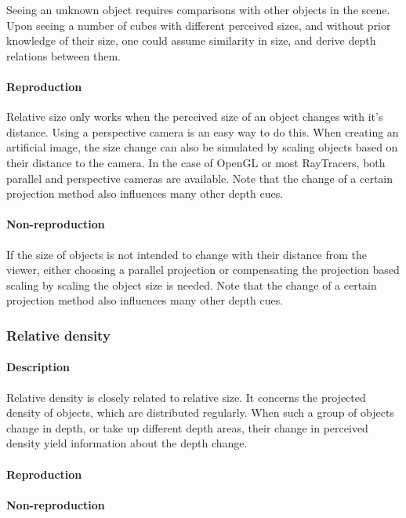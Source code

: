 Seeing an unknown object requires comparisons with other objects in the scene. Upon seeing a number of cubes with different perceived sizes, and without prior knowledge of their size, one could assume similarity in size, and derive depth relations between them.

\paragraph{Reproduction}
Relative size only works when the perceived size of an object changes with it's distance. Using a perspective camera is an easy way to do this. When creating an artificial image, the size change can also be simulated by scaling objects based on their distance to the camera. In the case of OpenGL or most RayTracers, both parallel and perspective cameras are available.
Note that the change of a certain projection method also influences many other depth cues.

\paragraph{Non-reproduction}
If the size of objects is not intended to change with their distance from the viewer, either choosing a parallel projection or compensating the projection based scaling by scaling the object size is needed.
Note that the change of a certain projection method also influences many other depth cues.


\subsubsection{Relative density}
\paragraph{Description}
Relative density is closely related to relative size. It concerns the projected density of objects, which are distributed regularly. When such a group of objects change in depth, or take up different depth areas, their change in perceived density yield information about the depth change.

\paragraph{Reproduction}

\paragraph{Non-reproduction}


